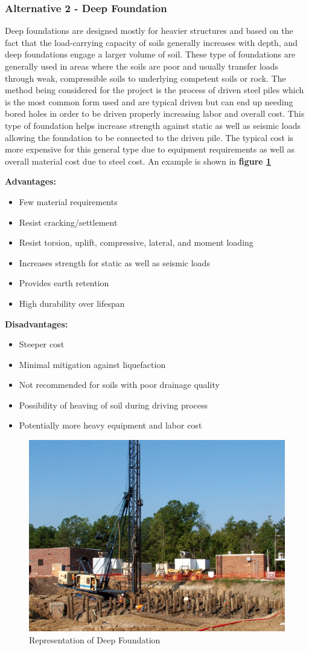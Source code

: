 \documentclass{ceri}
\begin{document}
\subsubsection{Alternative 2 - Deep Foundation}
Deep foundations are designed mostly for heavier structures and based on the fact that the load-carrying capacity of soils generally increases with depth, and deep foundations engage a larger volume of soil. These type of foundations are generally used in areas where the soils are poor and usually transfer loads through weak, compressible soils to underlying competent soils or rock. The method being considered for the project is the process of driven steel piles which is the most common form used and are typical driven but can end up needing bored holes in order to be driven properly increasing labor and overall cost. This type of foundation helps increase strength against static as well as seismic loads allowing the foundation to be connected to the driven pile. The typical cost is more expensive for this general type due to equipment requirements as well as overall material cost due to steel cost. An example is shown in \textbf{figure \ref{fig:Austin2}}

	\textbf{Advantages:}
\begin{itemize}
\item  Few material requirements
\item  Resist cracking/settlement
\item  Resist torsion, uplift, compressive, lateral, and moment loading
\item  Increases strength for static as well as seismic loads
\item  Provides earth retention
\item  High durability over lifespan
\end{itemize}
        
	\textbf{Disadvantages:}
\begin{itemize}
\item  Steeper cost
\item  Minimal mitigation against liquefaction
\item  Not recommended for soils with poor drainage quality
\item  Possibility of heaving of soil during driving process
\item  Potentially more heavy equipment and labor cost
\end{itemize}

\begin{figure}[H]
    \centering
    \includegraphics[width=.4\textwidth]{images/Austin2.png}
    \caption{Representation of Deep Foundation}
    \label{fig:Austin2}
\end{figure}
 
\end{document}
